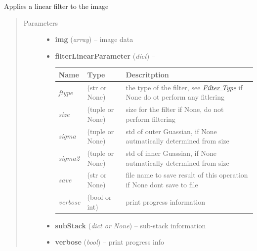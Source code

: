 \documentclass[letterpaper,10pt,english]{sphinxmanual}
\begin{document}
\begin{fulllineitems}
\label{api/ClearMap.ImageProcessing.Filter:ClearMap.ImageProcessing.Filter.LinearFilter.filterLinear}
Applies a linear filter to the image
\begin{quote}\begin{description}
\item[{Parameters}] \leavevmode\begin{itemize}
\item {} 
\textbf{img} (\emph{array}) --
image data

\item {} 
\textbf{filterLinearParameter} (\emph{dict}) --

\begin{tabulary}{\linewidth}{|L|L|L|}
\hline
\textsf{\relax 
Name
} & \textsf{\relax 
Type
} & \textsf{\relax 
Descritption
}\\
\hline
\emph{ftype}
 & 
(str or None)
 & 
the type of the filter, see {\hyperref[api/ClearMap.ImageProcessing.Filter:filtertypes]{\emph{Filter Type}}}
if None do ot perform any fitlering
\\
\hline
\emph{size}
 & 
(tuple or None)
 & 
size for the filter
if None, do not perform filtering
\\
\hline
\emph{sigma}
 & 
(tuple or None)
 & 
std of outer Guassian, if None autmatically determined from size
\\
\hline
\emph{sigma2}
 & 
(tuple or None)
 & 
std of inner Guassian, if None autmatically determined from size
\\
\hline
\emph{save}
 & 
(str or None)
 & 
file name to save result of this operation
if None dont save to file
\\
\hline
\emph{verbose}
 & 
(bool or int)
 & 
print progress information
\\
\hline\end{tabulary}


\item {} 
\textbf{subStack} (\emph{dict or None}) --
sub-stack information

\item {} 
\textbf{verbose} (\emph{bool}) --
print progress info


\end{itemize}
\end{description}
\end{quote}
\end{fulllineitems}
\end{document}
